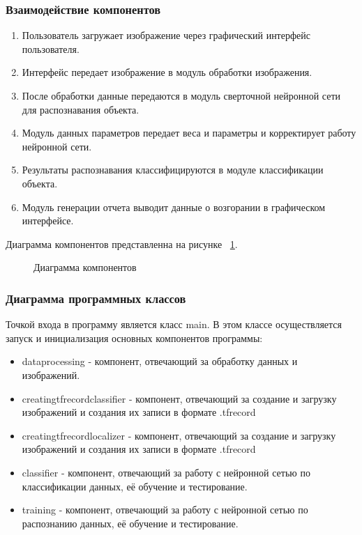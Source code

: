 \subsubsection{Взаимодействие компонентов}

\begin{enumerate}
\item Пользователь загружает изображение через графический интерфейс пользователя.
\item Интерфейс передает изображение в модуль обработки изображения.
\item После обработки данные передаются в модуль сверточной нейронной сети для распознавания объекта.
\item Модуль данных параметров передает веса и параметры и корректирует работу нейронной сети.
\item Результаты распознавания классифицируются в модуле классификации объекта.
\item Модуль генерации отчета выводит данные о возгорании в графическом интерфейсе.
\end{enumerate}

Диаграмма компонентов представленна на рисунке ~\ref{comp:image}.

\begin{figure}[H]
\caption{Диаграмма компонентов}
\label{comp:image}
\end{figure}

\subsubsection{Диаграмма программных классов}

Точкой входа в программу является класс main. В этом классе осуществляется запуск и инициализация основных компонентов программы:
\begin{itemize}
	\item dataprocessing - компонент, отвечающий за обработку данных и изображений.
	\item creatingtfrecordclassifier - компонент, отвечающий за создание и загрузку изображений и создания их записи в формате .tfrecord
	\item creatingtfrecordlocalizer - компонент, отвечающий за создание и загрузку изображений и создания их записи в формате .tfrecord
	\item classifier - компонент, отвечающий за работу с нейронной сетью по классификации данных, её обучение и тестирование.
	\item training - компонент, отвечающий за работу с нейронной сетью по распознанию данных, её обучение и тестирование.
\end{itemize}

